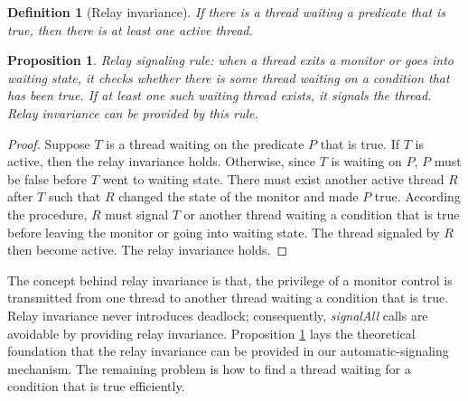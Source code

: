 \documentclass[preprint]{sigplanconf}
\newtheorem{definition}{Definition}
\newtheorem{proposition}{Proposition}
\begin{document}
\begin{definition}[Relay invariance]
    If there is a thread waiting a predicate that is true, then there is at
    least one active thread. 
    
\end{definition}
\begin{proposition} \label{pro:one}
    Relay signaling rule: when a thread exits a monitor or goes into waiting 
    state, it checks whether there is some thread waiting on a condition that 
    has been true. If at least one such waiting thread exists, it signals the 
    thread. Relay invariance can be provided by this rule. 
\end{proposition}
\begin{proof}
    Suppose $T$ is a thread waiting on the predicate $P$ that is true. If $T$ 
    is active, then the relay invariance holds. Otherwise, since $T$ is waiting 
    on $P$, $P$ must be false before $T$ went to waiting state. There must 
    exist another active thread $R$ after $T$ such that $R$ changed the state 
    of the monitor and made  $P$ true. According the procedure, $R$ must signal
    $T$ or another thread waiting a condition that is true before leaving the
    monitor or going into waiting state. The thread signaled by $R$ then become 
    active. The relay invariance holds. 
 
 \end{proof}

The concept behind relay invariance is that, the privilege of a monitor control
is transmitted from one thread to another thread waiting a condition that is
true.
Relay invariance never introduces deadlock; consequently, {\it signalAll} calls
are avoidable by providing relay invariance. 
Proposition \ref{pro:one} lays the theoretical foundation that the relay
invariance can be provided in our automatic-signaling mechanism. 
The remaining problem is how to find a thread waiting for a condition that is 
true efficiently. 
\end{document}
